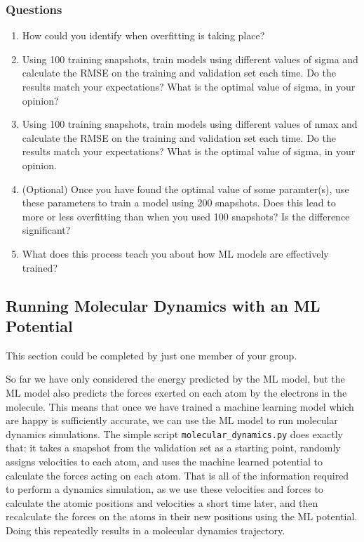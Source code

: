 \documentclass{article}
\begin{document}
\subsubsection*{Questions}

\begin{enumerate}
\item How could you identify when overfitting is taking place?
\item Using 100 training snapshots, train models using different values of sigma and calculate the RMSE on the training and validation set each time. Do the results match your expectations? What is the optimal value of sigma, in your opinion?
\item Using 100 training snapshots, train models using different values of nmax and calculate the RMSE on the training and validation set each time. Do the results match your expectations? What is the optimal value of sigma, in your opinion.
\item (Optional) Once you have found the optimal value of some paramter(s), use these parameters to train a model using 200 snapshots. Does this lead to more or less overfitting than when you used 100 snapshots? Is the difference significant?
\item What does this process teach you about how ML models are effectively trained?

\end{enumerate}



\subsection{Running Molecular Dynamics with an ML Potential}
\label{sec:md}

This section could be completed by just one member of your group.

So far we have only considered the energy predicted by the ML model, but the ML model also predicts the forces exerted on each atom by the electrons in the molecule. This means that once we have trained a machine learning model which are happy is sufficiently accurate, we can use the ML model to run molecular dynamics simulations. The simple script \verb|molecular_dynamics.py| does exactly that: it takes a snapshot from the validation set as a starting point, randomly assigns velocities to each atom, and uses the machine learned potential to calculate the forces acting on each atom. That is all of the information required to perform a dynamics simulation, as we use these velocities and forces to calculate the atomic positions and velocities a short time later, and then recalculate the forces on the atoms in their new positions using the ML potential. Doing this repeatedly results in a molecular dynamics trajectory.
\end{document}
